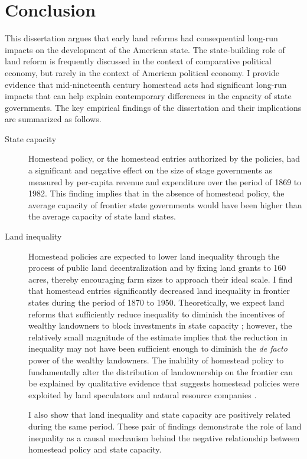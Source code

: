 \chapter{Conclusion} \label{diss-conclusion}

This dissertation argues that early land reforms had consequential long-run impacts on the development of the American state. The state-building role of land reform is frequently discussed in the context of comparative political economy, but rarely in the context of American political economy. I provide evidence that mid-nineteenth century homestead acts had significant long-run impacts that can help explain contemporary differences in the capacity of state governments. The key empirical findings of the dissertation and their implications are summarized as follows.

\begin{description}
	\item[State capacity] Homestead policy, or the homestead entries authorized by the policies, had a significant and negative effect on the size of stage governments as measured by per-capita revenue and expenditure over the period of 1869 to 1982. This finding implies that in the absence of homestead policy, the average capacity of frontier state governments would have been higher than the average capacity of state land states. 
	
	\item[Land inequality] Homestead policies are expected to lower land inequality through the process of public land decentralization and by fixing land grants to 160 acres, thereby encouraging farm sizes to approach their ideal scale. I find that homestead entries significantly decreased land inequality in frontier states during the period of 1870 to 1950. Theoretically, we expect land reforms that sufficiently reduce inequality to diminish the incentives of wealthy landowners to block investments in state capacity \citep{besley2009origins,galor2009inequality}; however, the relatively small magnitude of the estimate implies that the reduction in inequality may not have been sufficient enough to diminish the \emph{de facto} power of the wealthy landowners. The inability of homestead policy to fundamentally alter the distribution of landownership on the frontier can be explained by qualitative evidence that suggests homestead policies were exploited by land speculators and natural resource companies \citep{gates1968history,murtazashvili2013political}. 
	
	I also show that land inequality and state capacity are positively related during the same period. These pair of findings demonstrate the role of land inequality as a causal mechanism behind the negative relationship between homestead policy and state capacity. 
	

\end{description}
